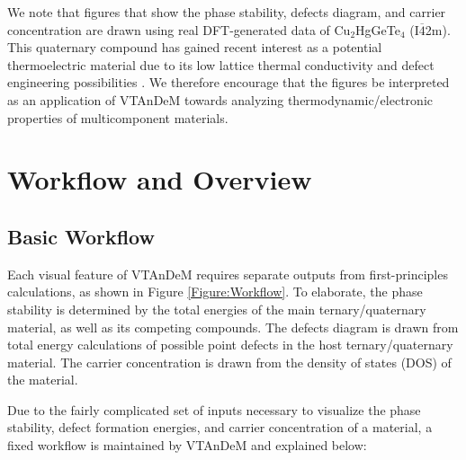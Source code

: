 \documentclass[%
 reprint,
 amsmath,amssymb,
 aps,
]{revtex4-1}
\begin{document}
We note that figures that show the phase stability, defects diagram, and carrier concentration are drawn using real DFT-generated data of Cu$_2$HgGeTe$_4$ (I$\overline{4}$2m). This quaternary compound has gained recent interest as a potential thermoelectric material due to its low lattice thermal conductivity and defect engineering possibilities \cite{2018_Ortiz, 2019_Ortiz, 2019_Gomes_InProgress, 2019_Qu_InProgress}. We therefore encourage that the figures be interpreted as an application of VTAnDeM towards analyzing thermodynamic/electronic properties of multicomponent materials.





\section{Workflow and Overview}
\label{Section_WorkflowOverview}

\subsection{Basic Workflow}
Each visual feature of VTAnDeM requires separate outputs from first-principles calculations, as shown in Figure \ref{Figure:Workflow}. To elaborate, the phase stability is determined by the total energies of the main ternary/quaternary material, as well as its competing compounds. The defects diagram is drawn from total energy calculations of possible point defects in the host ternary/quaternary material. The carrier concentration is drawn from the density of states (DOS) of the material.

Due to the fairly complicated set of inputs necessary to visualize the phase stability, defect formation energies, and carrier concentration of a material, a fixed workflow is maintained by VTAnDeM and explained below:
\end{document}
